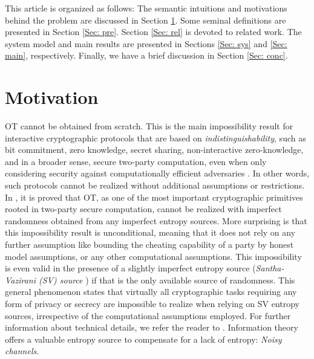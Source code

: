\documentclass[runningheads]{llncs}
\newcommand{\parbreak}{ \vspace{0.3 em}}
\newcounter{protocol}
\begin{document}
\parbreak This article is organized as follows: The semantic intuitions and motivations behind the problem are discussed in Section \ref{Sec: motiv}. Some seminal definitions are presented in Section \ref{Sec: pre}. Section \ref{Sec: rel} is devoted to related work. The system model and main results are presented in Sections \ref{Sec: sys} and \ref{Sec: main}, respectively. Finally, we have a brief discussion in Section \ref{Sec: conc}.

\section{Motivation}\label{Sec: motiv}
OT cannot be obtained from scratch. This is the main impossibility result for interactive cryptographic protocols that are based on \emph{indistinguishability}, such as bit commitment, zero knowledge, secret sharing, non-interactive zero-knowledge, and in a broader sense, secure two-party computation, even when only considering security against computationally efficient adversaries \cite{Dodis}. In other words, such protocols cannot be realized without additional assumptions or restrictions. In \cite{Dodis}, it is proved that OT, as one of the most important cryptographic primitives rooted in two-party secure computation, cannot be realized with imperfect randomness obtained from any imperfect entropy sources. More surprising is that this impossibility result is unconditional, meaning that it does not rely on any further assumption like bounding the cheating capability of a party by honest model assumptions, or any other computational assumptions. This impossibility is even valid in the presence of a slightly imperfect entropy source (\emph{Santha-Vazirani (SV) source} \cite{SV}) if that is the only available source of randomness. This general phenomenon states that virtually all cryptographic tasks requiring any form of privacy or secrecy are impossible to realize when relying on SV entropy sources, irrespective of the computational assumptions employed. For further information about technical details, we refer the reader to \cite[Lemma 3.1]{Dodis}. Information theory offers a valuable entropy source to compensate for a lack of entropy: \emph{Noisy channels}. 
\end{document}
